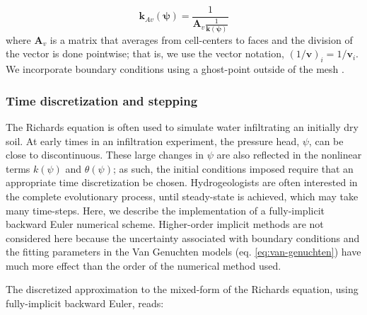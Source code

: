 \documentclass[preprint,review,3p,times,onecolumn,authoryear]{elsarticle}
\newcommand{\bfA}{\mathbf{A}}
\newcommand{\bfv}{\mathbf{v}}
\begin{document}
\begin{equation}
\label{eq:mass-matrix-kav}
\mathbf{k}_{Av}(\boldsymbol{\psi}) = \frac{1}{\mathbf{A}_v\frac{1}{\mathbf{k}(\boldsymbol{\psi})}}
\end{equation}
where $\bfA_{v}$ is a matrix that averages from cell-centers to faces and the division of the vector is done pointwise; that is, we use the vector notation, $(1/{\bfv})_{i} = 1/\bfv_{i}$. We incorporate boundary conditions using a ghost-point outside of the mesh \citep{tos}.


\subsubsection{Time discretization and stepping}

The Richards equation is often used to simulate water infiltrating an initially dry soil. At early times in an infiltration experiment, the pressure head, $\psi$, can be close to discontinuous. These large changes in $\psi$ are also reflected in the nonlinear terms $k(\psi)$ and $\theta(\psi)$; as such, the initial conditions imposed require that an appropriate time discretization be chosen. Hydrogeologists are often interested in the complete evolutionary process, until steady-state is achieved, which may take many time-steps. Here, we describe the implementation of a fully-implicit backward Euler numerical scheme. Higher-order implicit methods are not considered here because the uncertainty associated with boundary conditions and the fitting parameters in the Van Genuchten models (eq. \ref{eq:van-genuchten}) have much more effect than the order of the numerical method used.

The discretized approximation to the mixed-form of the Richards equation, using fully-implicit backward Euler, reads:
\end{document}
